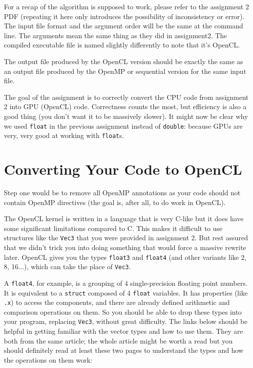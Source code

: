\documentclass[letterpaper,10pt]{article}
\begin{document}
For a recap of the algorithm is supposed to work, please refer to the assignment 2 PDF (repeating it here only introduces the possibility of inconsistency or error). 
The input file format and the argument order will be the same at the command line. 
The arguments mean the same thing as they did in assignment2. 
The compiled executable file is named slightly differently to note that it's OpenCL. 


The output file produced by the 
OpenCL version should be exactly the same as an output file produced by the OpenMP or
sequential version for the same input file.

The goal of the assignment is to correctly convert the CPU code from assignment 2 into GPU (OpenCL) code. Correctness counts the most, but efficiency is also a good thing (you don't want it to be massively slower). It might now be clear why we used \texttt{float} in the previous assignment instead of \texttt{double}: because GPUs are very, very good at working with \texttt{float}s. 

\section*{Converting Your Code to OpenCL}

Step one would be to remove all OpenMP annotations as your code should not contain
OpenMP directives (the goal is, after all, to do work in OpenCL).

The OpenCL kernel is written in a language that is very C-like but it does have some
significant limitations compared to C. This makes it difficult to use 
structures like the \texttt{Vec3} that you were provided in assignment 2. But rest 
assured that we didn't trick you into doing something that would force a massive 
rewrite later. OpenCL gives you the types \texttt{float3} and \texttt{float4} (and other variants like 2, 8, 16...), which can take the place of \texttt{Vec3}.

A \texttt{float4}, for example, is a grouping of 4 single-precision floating point numbers. It is
equivalent to a \texttt{struct} composed of 4 \texttt{float} variables. It has
properties (like \texttt{.x}) to access the components, and there are already
defined arithmetic and comparison operations on them. So you should be able to drop
these types into your program, replacing \texttt{Vec3}, without great difficulty.
The links below should be helpful in getting familiar with the vector types and how 
to use them. They are both from the same article; the whole article might be worth a 
read but you should definitely read at least these two pages to understand the 
types and how the operations on them work:
\end{document}

